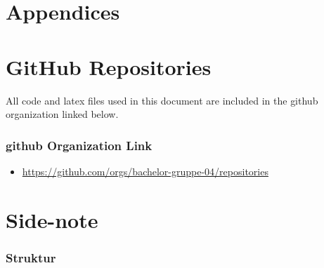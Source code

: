 \chapter*{\LARGE Appendices}

\appendix

\chapter{GitHub Repositories}

All code and \gls{latex} files used in this document are included in the \gls{github} organization linked below.

\subsection*{\gls{github} Organization Link}

\begin{itemize}
    \item \url{https://github.com/orgs/bachelor-gruppe-04/repositories}
\end{itemize}

\chapter{Side-note}

\subsection*{Struktur}

